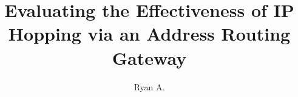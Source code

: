 \documentclass[]{afit-etd}
\title  {Evaluating the Effectiveness of IP Hopping via an Address Routing Gateway}
\author          {Ryan A.}{Morehart}
\begin{document}
\listofacronyms{
	
}

\makePrefatoryPages 

\acresetall








\appendix







\end{document}
